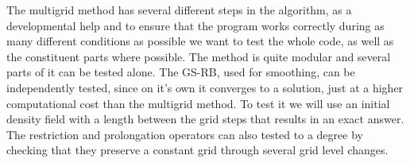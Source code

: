 
The multigrid method has several different steps in the algorithm, as a developmental help and to ensure that the program works correctly during as many different conditions as possible we want to test the whole code, as well as the constituent parts where possible. The method is quite modular and several parts of it can be tested alone. The GS-RB, used for smoothing, can be independently tested, since on it's own it converges to a solution, just at a higher computational cost than the multigrid method. To test it we will use an initial density field with a length between the grid steps that results in an exact answer. The restriction and prolongation operators can also tested to a degree by checking that they preserve a constant grid through several grid level changes. 

